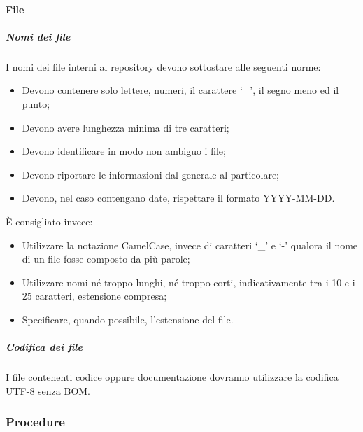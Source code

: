 \documentclass[../NormeProgetto.tex]{subfiles}
\begin{document}
	\paragraph{File}	
		\subparagraph{Nomi dei file}
	I nomi dei file interni al repository devono sottostare alle seguenti norme:
	\begin{itemize}
		\item Devono contenere solo lettere, numeri, il carattere `\_', il segno meno ed il punto;
		\item Devono avere lunghezza minima di tre caratteri;
		\item Devono identificare in modo non ambiguo i file;
		\item Devono riportare le informazioni dal generale al particolare;
		\item Devono, nel caso contengano date, rispettare il formato YYYY-MM-DD.
	\end{itemize}
	È consigliato invece:
	\begin{itemize}
		\item Utilizzare la notazione CamelCase, invece di caratteri `\_' e `-' qualora il nome di un file fosse composto da più parole;
		\item Utilizzare nomi né troppo lunghi, né troppo corti, indicativamente tra i 10 e i 25 caratteri, estensione compresa;
		\item Specificare, quando possibile, l'estensione del file.
	\end{itemize}
		\subparagraph{Codifica dei file}
	I file contenenti codice oppure documentazione dovranno utilizzare la codifica UTF-8 senza BOM.
	\subsubsection{Procedure}
\end{document}
